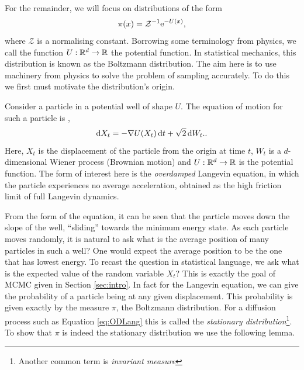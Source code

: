 For the remainder, we will focus on distributions of the form 
\[ \pi(x)=\mathcal{Z}^{-1}\mathrm{e}^{-U(x)},\]
where \(\mathcal{Z}\) is a normalising constant. Borrowing some terminology from physics, we call the function \(U:\mathbb{R}^d\to\mathbb{R}\) the potential function. In statistical mechanics, this distribution is known as the Boltzmann distribution. The aim here is to use machinery from physics to solve the problem of sampling accurately. To do this we first must motivate the distribution's origin.

Consider a particle in a potential well of shape \(U\). The equation of motion for such a particle is \cite{Langevin1908}, 
\begin{equation} \mathop{}\!\mathrm{d} X_t = -\nabla U(X_t)\mathop{}\!\mathrm{d} t +\sqrt{2}\mathop{}\!\mathrm{d} W_t. \label{eq:ODLang}.\end{equation}
Here, \(X_t\) is the displacement of the particle from the origin at time \(t\), \(W_t\) is a \(d\)-dimensional Wiener process (Brownian motion) and \(U:\mathbb{R}^d \to \mathbb{R}\) is the potential function. The form of interest here is the \emph{overdamped} Langevin equation, in which the particle experiences no average acceleration, obtained as the high friction limit of full Langevin dynamics.

From the form of the equation, it can be seen that the particle moves down the slope of the well, ``sliding'' towards the minimum energy state. As each particle moves randomly, it is natural to ask what is the average position of many particles in such a well? One would expect the average position to be the one that has lowest energy. To recast the question in statistical language, we ask what is the expected value of the random variable \(X_t\)? This is exactly the goal of MCMC given in Section \ref{sec:intro}. In fact for the Langevin equation, we can give the probability of a particle being at any given displacement. This probability is given exactly by the measure \(\pi\), the Boltzmann distribution. For a diffusion process such as Equation \ref{eq:ODLang} this is called the \emph{stationary distribution}\footnote{Another common term is \emph{invariant measure}}. To show that \(\pi\) is indeed the stationary distribution we use the following lemma.

